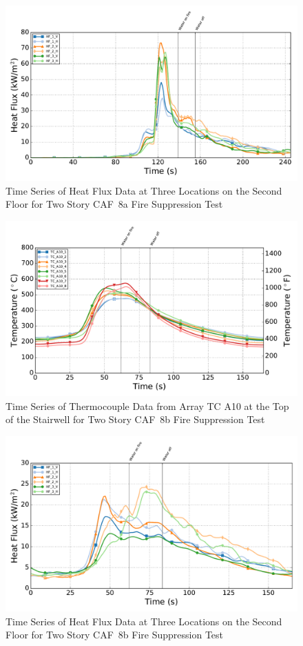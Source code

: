\documentclass[12pt,oneside]{book}
\begin{document}
\begin{figure}[!ht]
	\includegraphics[width=.85\columnwidth]{../Figures/Script_Figures/Test_40a_West_061415_Heat_Flux}
	\caption{Time Series of Heat Flux Data at Three Locations on the Second Floor for Two Story CAF~8a Fire Suppression Test}
	\label{fig:app_caf8a_hf}
\end{figure}

\begin{figure}[!ht]
	\includegraphics[width=.85\columnwidth]{../Figures/Script_Figures/Test_40b_West_061415_TC_A10}
	\caption{Time Series of Thermocouple Data from Array TC A10 at the Top of the Stairwell for Two Story CAF~8b Fire Suppression Test}
	\label{fig:app_caf8b_tca10}
\end{figure}

\begin{figure}[!ht]
	\includegraphics[width=.85\columnwidth]{../Figures/Script_Figures/Test_40b_West_061415_Heat_Flux}
	\caption{Time Series of Heat Flux Data at Three Locations on the Second Floor for Two Story CAF~8b Fire Suppression Test}
	\label{fig:app_caf8b_hf}
\end{figure}
\end{document}
